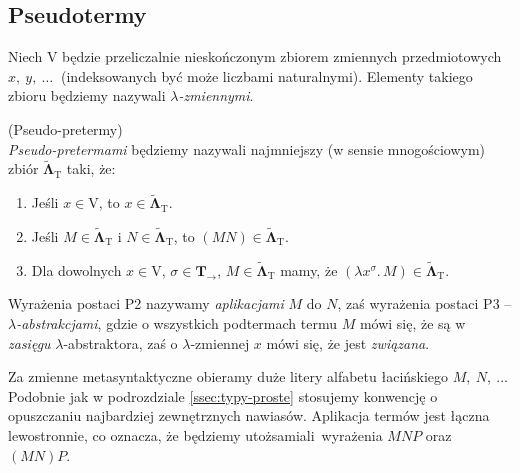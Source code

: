 \subsection{Pseudotermy}
  Niech \(\mathrm{V}\) będzie przeliczalnie nieskończonym zbiorem zmiennych przedmiotowych \(x,\ y,\ \dots\ \) (indeksowanych być może liczbami naturalnymi). Elementy takiego zbioru będziemy nazywali \emph{\(\lambda\)-zmiennymi}.
\begin{definicja}(Pseudo-pretermy)\\
  \emph{Pseudo-pretermami} będziemy nazywali najmniejszy (w sensie mnogościowym) zbiór \(\mathbf{\tilde\Lambda}_{\mathrm{T}}\) taki, że:

\begin{enumerate}[label=P\arabic*.]
  \item Jeśli \(x\in \mathrm{V}\), to \(x\in{\mathbf{\tilde\Lambda}}_{\mathrm{T}}\).
  \item Jeśli \(M\in\mathbf{\tilde{\Lambda}}_{\mathrm{T}}\) i \(N\in\mathbf{\tilde{\Lambda}}_{\mathrm{T}}\), to \((MN)\in\mathbf{\tilde{\Lambda}}_{\mathrm{T}}\).
  \item Dla dowolnych \(x\in \mathrm{V}\), \(\sigma\in\mathbf{T}_\to\), \(M\in\mathbf{\tilde{\Lambda}}_{\mathrm{T}}\) mamy, że \((\lambda x^{\sigma}.\,M)\in \mathbf{\tilde{\Lambda}}_{\mathrm{T}}\).
  \end{enumerate}
\end{definicja}
  Wyrażenia postaci P2 nazywamy \emph{aplikacjami} \(M\) do \(N\), zaś wyrażenia postaci P3 -- \emph{\(\lambda\)-abstrakcjami}, gdzie o wszystkich podtermach termu \(M\) mówi się, że są w \emph{zasięgu} \(\lambda\)-abstraktora, zaś o \(\lambda\)-zmiennej \(x\) mówi się, że jest \emph{związana}.

  Za zmienne metasyntaktyczne obieramy duże litery alfabetu łacińskiego \(M,\ N,\ \dots\ \) Podobnie jak w podrozdziale \ref{ssec:typy-proste} stosujemy konwencję o opuszczaniu najbardziej zewnętrznych nawiasów. Aplikacja termów jest łączna lewostronnie, co oznacza, że będziemy utożsamiali wyrażenia \(MNP\) oraz \((MN)P\).

